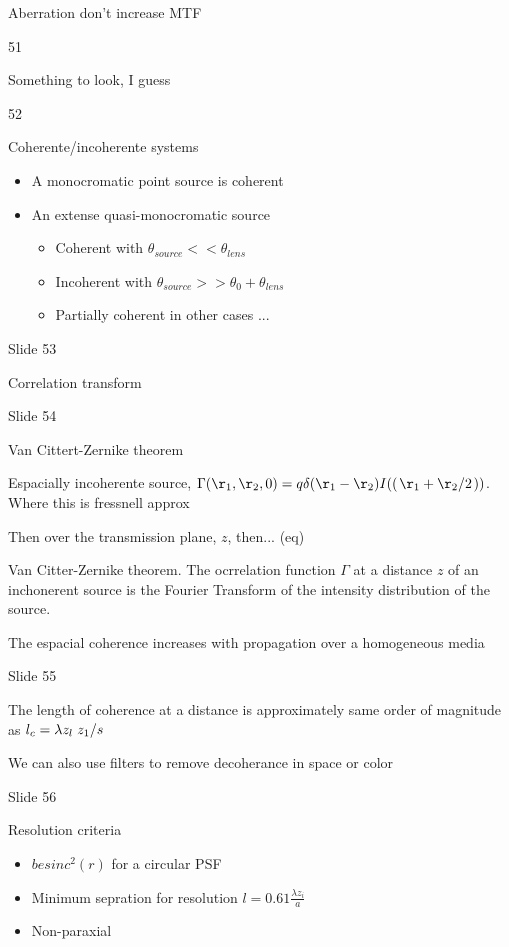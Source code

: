 \documentclass[../main/main.tex]{subfiles}
\begin{document}
Aberration don't increase MTF

51

Something to look, I guess

52

Coherente/incoherente systems

\begin{itemize}
	\item A monocromatic point source is coherent
	\item An extense quasi-monocromatic source
	      \begin{itemize}
		      \item Coherent with $\theta_{source} < < \theta_{lens}$
		      \item Incoherent with $\theta_{source} > > \theta_0 + \theta_{lens}$

		      \item Partially coherent in other cases ...
	      \end{itemize}
\end{itemize}

Slide 53

Correlation transform

Slide 54

Van Cittert-Zernike theorem

Espacially incoherente source, $\Gamma(\r_1, \r_2, 0) = q \delta(\r_1-\r_2) I((\flatfrac{\r_1+\r_2}{2}))$. Where this is fressnell approx

Then over the transmission plane, $z$, then... (eq)

Van Citter-Zernike theorem. The ocrrelation function $\Gamma$ at a distance $z$ of an inchonerent source is the Fourier Transform of the intensity distribution of the source.

The espacial coherence increases with propagation over a homogeneous  media


Slide 55

The length of coherence at a distance is approximately same order of magnitude as $l_c = \lambda z_l \flatfrac{z_1}{s}$

We can also use filters to remove decoherance in space or color


Slide 56

Resolution criteria

\begin{itemize}
	\item $besinc^2(r) $ for a circular PSF
	\item Minimum sepration for resolution $l = 0.61 \frac{\lambda z_i}{a}$
	\item Non-paraxial
\end{itemize}
\end{document}

